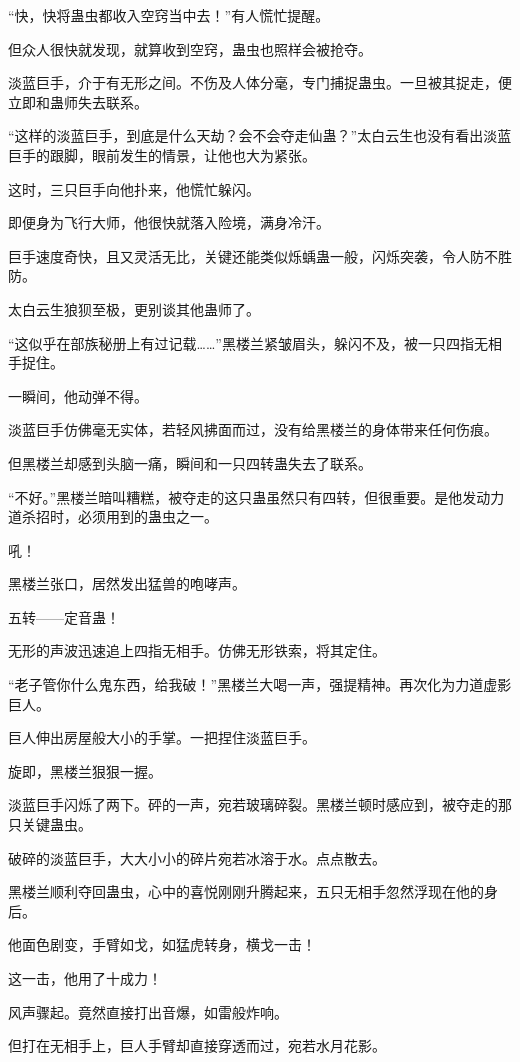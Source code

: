 \begin{this_body}
“快，快将蛊虫都收入空窍当中去！”有人慌忙提醒。

但众人很快就发现，就算收到空窍，蛊虫也照样会被抢夺。

淡蓝巨手，介于有无形之间。不伤及人体分毫，专门捕捉蛊虫。一旦被其捉走，便立即和蛊师失去联系。

“这样的淡蓝巨手，到底是什么天劫？会不会夺走仙蛊？”太白云生也没有看出淡蓝巨手的跟脚，眼前发生的情景，让他也大为紧张。

这时，三只巨手向他扑来，他慌忙躲闪。

即便身为飞行大师，他很快就落入险境，满身冷汗。

巨手速度奇快，且又灵活无比，关键还能类似烁蝺蛊一般，闪烁突袭，令人防不胜防。

太白云生狼狈至极，更别谈其他蛊师了。

“这似乎在部族秘册上有过记载……”黑楼兰紧皱眉头，躲闪不及，被一只四指无相手捉住。

一瞬间，他动弹不得。

淡蓝巨手仿佛毫无实体，若轻风拂面而过，没有给黑楼兰的身体带来任何伤痕。

但黑楼兰却感到头脑一痛，瞬间和一只四转蛊失去了联系。

“不好。”黑楼兰暗叫糟糕，被夺走的这只蛊虽然只有四转，但很重要。是他发动力道杀招时，必须用到的蛊虫之一。

吼！

黑楼兰张口，居然发出猛兽的咆哮声。

五转——定音蛊！

无形的声波迅速追上四指无相手。仿佛无形铁索，将其定住。

“老子管你什么鬼东西，给我破！”黑楼兰大喝一声，强提精神。再次化为力道虚影巨人。

巨人伸出房屋般大小的手掌。一把捏住淡蓝巨手。

旋即，黑楼兰狠狠一握。

淡蓝巨手闪烁了两下。砰的一声，宛若玻璃碎裂。黑楼兰顿时感应到，被夺走的那只关键蛊虫。

破碎的淡蓝巨手，大大小小的碎片宛若冰溶于水。点点散去。

黑楼兰顺利夺回蛊虫，心中的喜悦刚刚升腾起来，五只无相手忽然浮现在他的身后。

他面色剧变，手臂如戈，如猛虎转身，横戈一击！

这一击，他用了十成力！

风声骤起。竟然直接打出音爆，如雷般炸响。

但打在无相手上，巨人手臂却直接穿透而过，宛若水月花影。


\end{this_body}
